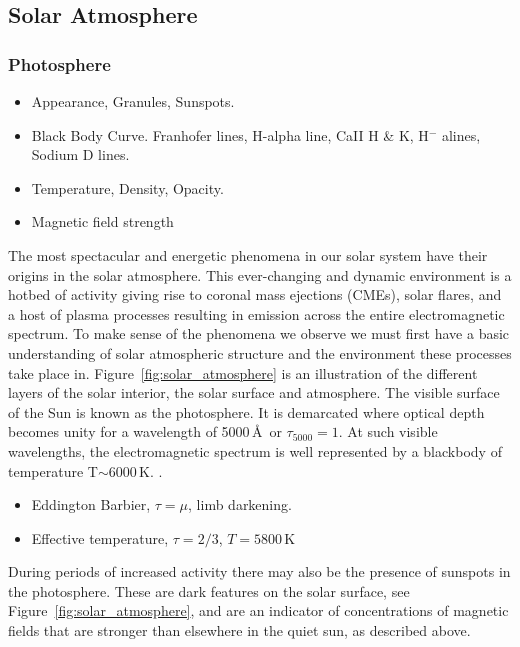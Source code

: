 \subsection{Solar Atmosphere}\label{sec:12}

\subsubsection{Photosphere}\label{sec:121}

\begin{itemize}
\item Appearance, Granules, Sunspots.
\item Black Body Curve. Franhofer lines, H-alpha line, CaII H \& K, H$^{-}$ alines, Sodium D lines. 
\item Temperature, Density, Opacity.
\item Magnetic field strength
\end{itemize}

The most spectacular and energetic phenomena in our solar system have their origins in the solar atmosphere. This ever-changing and dynamic environment is a hotbed of activity giving rise to coronal mass ejections (CMEs), solar flares, and a host of plasma processes resulting in emission across the entire electromagnetic spectrum. To make sense of the phenomena we observe we must first have a basic understanding of solar atmospheric structure and the environment these processes take place in. Figure~\ref{fig:solar_atmosphere} is an illustration of the different layers of the solar interior, the solar surface and atmosphere. The visible surface of the Sun is known as the photosphere. It is demarcated where optical depth becomes unity for a wavelength of 5000\,\AA\ or $\tau_{5000}=1$. At such visible wavelengths, the electromagnetic spectrum is well represented by a blackbody of temperature T$\sim$6000\,K. .

\begin{itemize}
\item Eddington Barbier, $\tau=\mu$, limb darkening.
\item Effective temperature, $\tau=2/3$, $T=5800$\,K
\end{itemize}

During periods of increased activity there may also be the presence of sunspots in the photosphere. These are dark features on the solar surface, see Figure~\ref{fig:solar_atmosphere}, and are an indicator of concentrations of magnetic fields that are stronger than elsewhere in the quiet sun, as described above. 

